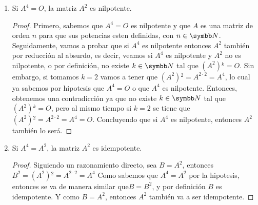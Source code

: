 \begin{enumerate}[label=\listAlph]
\begin{proof}
                \[
                    \begin{aligned}
                        (I_n i_j){}_j &= \sum_{k = 0}^{j - 1} (1 \cdot 0) + (1 \cdot 1) + \sum_{k = 0}^{n - j} (1 \cdot 0) \\
                        &= 0 + 1^2 + 0 \\
                        &= 1
                    \end{aligned}
                \]
                Y las otras componentes diferentes a \(j\) de \(I_n i_j\) van a ser iguales a cero, ya que solo se va a tener multiplicaciones entre filas y columnas de ceros.
                Además con este resultado de \(I_n^2\) se puede ver que \(I_n = I_n^2\) ya que comparten las mismas componentes, es decir \(I_n\) es idempotente.
            \end{proof}
        \setcounter{enumii}{4}
        \item Si \(A^4 = O\), la matriz \(A^2\) es nilpotente.
            \begin{proof}
                Primero, sabemos que \(A^4 = O\) es nilpotente y que \(A\) es una matriz de orden \(n\) para que sus potencias esten definidas, con \(n \in \realN\).
                Seguidamente, vamos a probar que si \(A^4\) es nilpotente entonces \(A^2\) también por reducción al absurdo, es decir, 
                veamos si \(A^4\) es nilpotente y \(A^2\) no es nilpotente, o por definición, no existe \(k \in \realN\) tal que \(\left(A^2\right){}^k = O\). 
                Sin embargo, si tomamos \(k = 2\) vamos a tener que \(\left(A^2\right){}^2 = A^{2 \cdot 2} = A^4\),
                lo cual ya sabemos por hipotesis que \(A^4 = O\) o que \(A^4\) es nilpotente. Entonces, obtenemos una contradicción ya que no existe \(k \in \realN\) tal que 
                \(\left(A^2\right){}^k = O\), pero al mismo tiempo si \(k = 2\) se tiene que \(\left(A^2\right){}^2 = A^{2 \cdot 2} = A^4 = O\).
                Concluyendo que si \(A^4\) es nilpotente, entonces \(A^2\) también lo será.
            \end{proof}
        \setcounter{enumii}{5}
        \item Si \(A^4 = A^2\), la matriz \(A^2\) es idempotente.
            \begin{proof}
                Siguiendo un razonamiento directo, sea \(B = A^2\), entonces \(B^2 = \left(A^2\right){}^2 = A^{2 \cdot 2} = A^4\)
                Como sabemos que \(A^4 = A^2\) por la hipotesis, entonces se va de manera similar que\(B = B^2\), y por definición \(B\) es idempotente.
                Y como \(B = A^2\), entonces \(A^2\) también va a ser idempotente.
            \end{proof}
    \end{enumerate}
